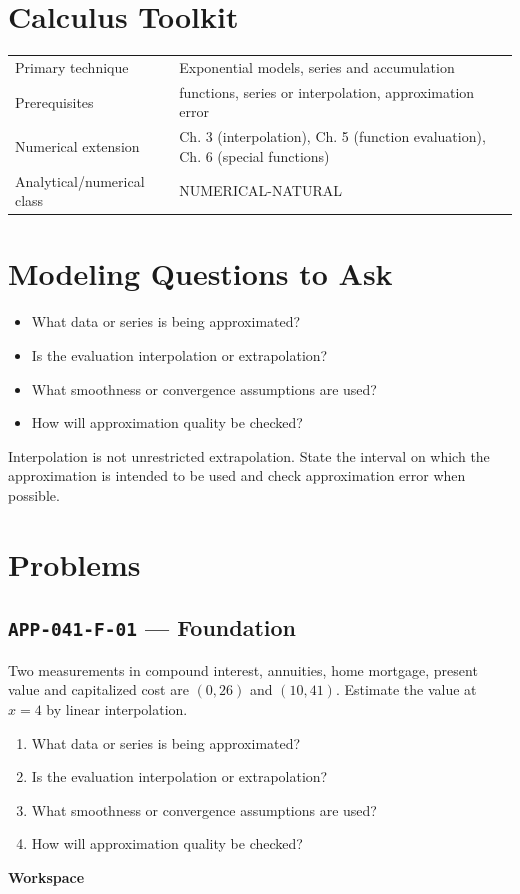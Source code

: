 \documentclass[11pt]{book}
\newcommand{\pid}[1]{\texttt{#1}}
\newcommand{\workspace}{\par\vspace{0.7in}\hrulefill\par\vspace{0.55in}\hrulefill\par}
\begin{document}
\section*{Calculus Toolkit}
\begin{tabularx}{\textwidth}{@{}lX@{}}\toprule
Primary technique & Exponential models, series and accumulation \\
Prerequisites & functions, series or interpolation, approximation error \\
Numerical extension & Ch. 3 (interpolation), Ch. 5 (function evaluation), Ch. 6 (special functions) \\
Analytical/numerical class & NUMERICAL-NATURAL \\
\bottomrule\end{tabularx}
\section*{Modeling Questions to Ask}\begin{itemize}
\item What data or series is being approximated?
\item Is the evaluation interpolation or extrapolation?
\item What smoothness or convergence assumptions are used?
\item How will approximation quality be checked?
\end{itemize}
\begin{errorbox}Interpolation is not unrestricted extrapolation. State the interval on which the approximation is intended to be used and check approximation error when possible.\end{errorbox}
\section*{Problems}
\subsection*{\pid{APP-041-F-01} — Foundation}
\begin{problembox}
Two measurements in compound interest, annuities, home mortgage, present value and capitalized cost are $(0,26)$ and $(10,41)$. Estimate the value at $x=4$ by linear interpolation.
\end{problembox}
\begin{promptbox}\begin{enumerate}
\item What data or series is being approximated?
\item Is the evaluation interpolation or extrapolation?
\item What smoothness or convergence assumptions are used?
\item How will approximation quality be checked?
\end{enumerate}\end{promptbox}
\textbf{Workspace}\workspace
{}
\end{document}
